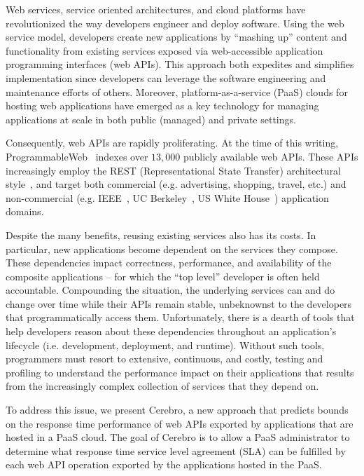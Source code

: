 Web services, service oriented architectures, and cloud platforms have
revolutionized the way developers engineer and deploy software.
Using the web service model, developers create new applications
by ``mashing up'' content and functionality 
from existing services 
exposed via web-accessible application programming interfaces (web APIs).
This approach both expedites and simplifies implementation since 
developers can leverage the 
software engineering and maintenance efforts of others.
Moreover, platform-as-a-service (PaaS) clouds
for hosting web applications have emerged as a key
technology for managing applications at scale in both public (managed) and 
private settings.  

Consequently, web APIs are rapidly 
proliferating.  At the time of this writing, 
ProgrammableWeb~\cite{pweb} indexes over $13,000$
publicly available web APIs.
These APIs increasingly employ the REST (Representational State Transfer) 
architectural style~\cite{Fielding:2000:ASD:932295}, and target both
commercial (e.g. advertising, shopping, travel, etc.) and non-commercial
(e.g. IEEE~\cite{ieeeapis}, UC Berkeley~\cite{ucbapis}, US White
House~\cite{whitehouseapis}) application domains.

Despite the many benefits, reusing existing services also has its costs.  
In particular, new applications become dependent on the 
services they compose.  These dependencies
impact correctness, performance, and availability of the composite 
applications -- for which the ``top level'' developer is often held accountable.  
Compounding the situation, the underlying services can and do change over time
while their APIs remain stable,
unbeknownst to the developers that programmatically access them.
Unfortunately, there is a dearth of tools that help developers reason about these 
dependencies throughout an application's 
lifecycle (i.e. development, deployment, and runtime).  Without such tools, 
programmers must resort to extensive, continuous, and costly, testing and profiling 
to understand the performance impact on their applications
that results from the increasingly complex collection of
services that they depend on.

To address this issue, we present Cerebro, a new approach that
predicts bounds on 
the response time performance of web
APIs exported by applications that are hosted in a PaaS cloud.
The goal of Cerebro is to allow 
a PaaS administrator to determine what response time service level agreement (SLA) can be
fulfilled by each web API operation exported by the applications
hosted in the PaaS.  

